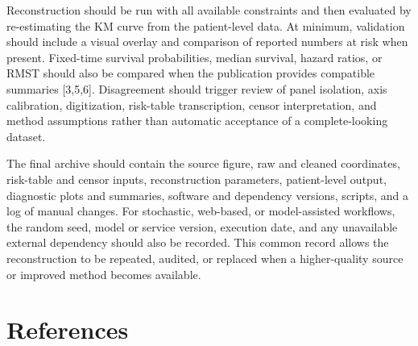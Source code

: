 \documentclass[
  english,
  letterpaper,
  DIV=11,
  numbers=noendperiod]{scrartcl}
\begin{document}
Reconstruction should be run with all available constraints and then
evaluated by re-estimating the KM curve from the patient-level data. At
minimum, validation should include a visual overlay and comparison of
reported numbers at risk when present. Fixed-time survival
probabilities, median survival, hazard ratios, or RMST should also be
compared when the publication provides compatible summaries {[}3,5,6{]}.
Disagreement should trigger review of panel isolation, axis calibration,
digitization, risk-table transcription, censor interpretation, and
method assumptions rather than automatic acceptance of a
complete-looking dataset.

The final archive should contain the source figure, raw and cleaned
coordinates, risk-table and censor inputs, reconstruction parameters,
patient-level output, diagnostic plots and summaries, software and
dependency versions, scripts, and a log of manual changes. For
stochastic, web-based, or model-assisted workflows, the random seed,
model or service version, execution date, and any unavailable external
dependency should also be recorded. This common record allows the
reconstruction to be repeated, audited, or replaced when a
higher-quality source or improved method becomes available.

\section{References}\label{references}
\end{document}
